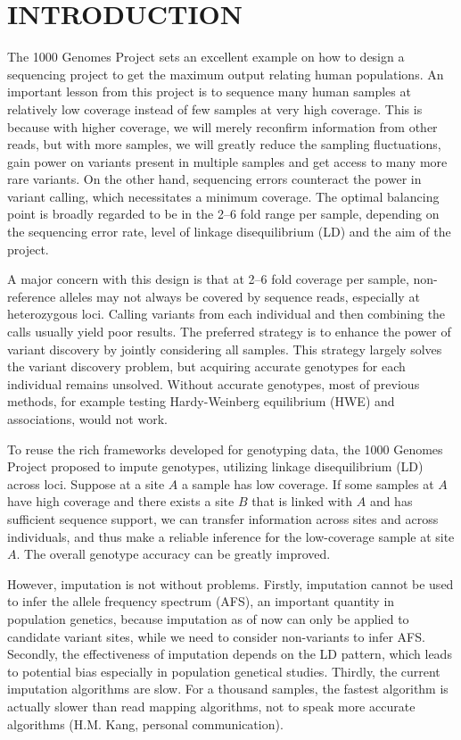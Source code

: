 \documentclass{bioinfo}
\begin{document}
\section{INTRODUCTION}

The 1000 Genomes Project sets an excellent example on how to design a sequencing project to
get the maximum output relating human populations. An important lesson from this project
is to sequence many human samples at relatively low coverage instead of
few samples at very high coverage. This is because with higher coverage,
we will merely reconfirm information from other reads, but with more samples, we
will greatly reduce the sampling fluctuations, gain power on variants present in
multiple samples and get access to many more rare variants. On the other hand, sequencing
errors counteract the power in variant calling, which necessitates a minimum coverage.
The optimal balancing point is broadly regarded to be in the 2--6 fold range per sample,
depending on the sequencing error rate, level of linkage disequilibrium (LD) and the
aim of the project.

A major concern with this design is that at 2--6 fold coverage per sample, non-reference alleles
may not always be covered by sequence reads, especially at heterozygous loci. Calling
variants from each individual and then combining the calls usually yield poor results.
The preferred strategy is to enhance the power of variant discovery by jointly considering
all samples. This strategy largely solves the variant discovery problem, but acquiring
accurate genotypes for each individual remains unsolved. Without accurate genotypes,
most of previous methods, for example testing Hardy-Weinberg equilibrium (HWE) and associations,
would not work.

To reuse the rich frameworks developed for genotyping data, the 1000 Genomes Project proposed to impute
genotypes, utilizing linkage disequilibrium (LD) across loci.
Suppose at a site $A$ a sample has low coverage.
If some samples at $A$ have high coverage and there exists a site $B$ that is linked with $A$ and has
sufficient sequence support, we can transfer information across sites and across individuals, and
thus make a reliable inference for the low-coverage sample at site $A$. The overall genotype accuracy
can be greatly improved.

However, imputation is not without problems. Firstly, imputation cannot be used to infer
the allele frequency spectrum (AFS), an important quantity in population genetics, because
imputation as of now can only be applied to candidate variant sites, while we need to consider
non-variants to infer AFS. Secondly, the effectiveness of imputation depends on the LD pattern, which
leads to potential bias especially in population genetical studies. Thirdly, the current
imputation algorithms are slow. For a thousand samples, the fastest algorithm is actually
slower than read mapping algorithms, not to speak more accurate algorithms (H.M. Kang, personal communication).
\end{document}
